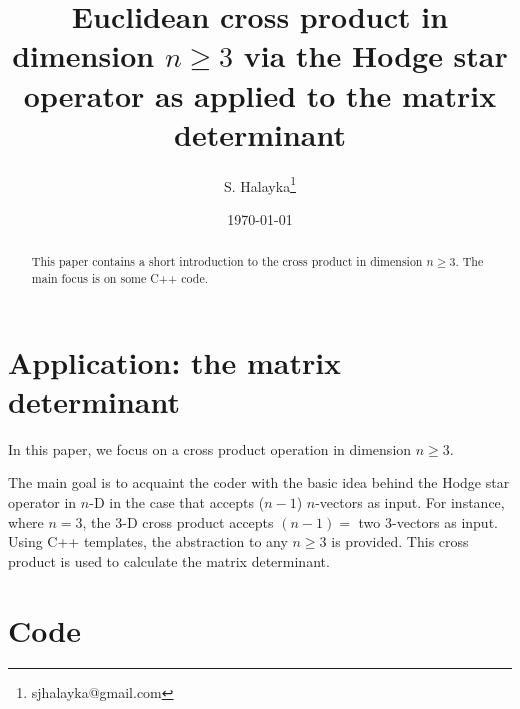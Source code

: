 \documentclass[12pt]{article}
\title{Euclidean cross product in dimension $n \ge 3$ via the Hodge star operator as applied to the matrix determinant}
\author{S. Halayka\footnote{sjhalayka@gmail.com}}
\date{\today\;\currenttime}
\begin{document}
 
\maketitle

\begin{abstract}
This paper contains a short introduction to the cross product in dimension $n \ge 3$.
The main focus is on some C++ code.
\end{abstract}




\section{Application: the matrix determinant}

In this paper, we focus on a cross product operation in dimension $n \ge 3$.

The main goal is to acquaint the coder with the basic idea behind the Hodge star operator in $n$-D in the case that accepts ($n - 1$) $n$-vectors as input. 
For instance, where $n = 3$, the $3$-D cross product accepts $(n - 1) = $ two $3$-vectors as input.
Using C++ templates, the abstraction to any $n \ge 3$ is provided.
This cross product is used to calculate the matrix determinant.

\section{Code}
\end{document}
